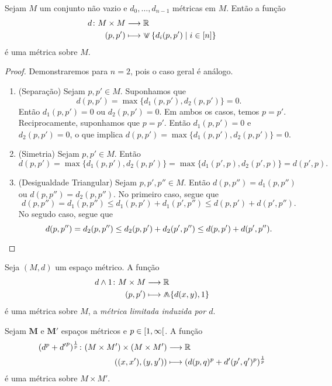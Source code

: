 \begin{proposition}
Sejam $M$ um conjunto não vazio e $d_0, \ldots,d_{n-1}$ métricas em $M$. Então a função
	\begin{align*}
	\func{d}{M \times M}{\R}{(p,p')}{\max\set{d_i(p,p')}{i \in [n]}}
	\end{align*}
é uma métrica sobre $M$.
\end{proposition}
\begin{proof}
Demonstraremos para $n=2$, pois o caso geral é análogo.
	\begin{enumerate}
	\item (Separação) Sejam $p,p' \in M$. Suponhamos que
	\begin{equation*}
	d(p,p')=\max\{d_1(p,p'),d_2(p,p')\}=0.
	\end{equation*}
Então $d_1(p,p')=0$ ou $d_2(p,p')=0$. Em ambos os casos, temos $p=p'$. Reciprocamente, suponhamos que $p=p'$. Então $d_1(p,p')=0$ e $d_2(p,p')=0$, o que implica $d(p,p')=\max\{d_1(p,p'),d_2(p,p')\}=0$.
	
	\item (Simetria) Sejam $p,p' \in M$. Então
	\begin{equation*}
	d(p,p') = \max\{d_1(p,p'),d_2(p,p')\} = \max\{d_1(p',p),d_2(p',p)\} = d(p',p).
	\end{equation*}
	
	\item (Desigualdade Triangular) Sejam $p,p',p'' \in M$. Então $d(p,p'')=d_1(p,p'')$ ou $d(p,p'')=d_2(p,p'')$. No primeiro caso, segue que
	\begin{equation*}
	d(p,p'') = d_1(p,p'') \leq d_1(p,p') + d_1(p',p'') \leq d(p,p') + d(p',p'').
	\end{equation*}
	No segudo caso, segue que
	\begin{equation*}
	d(p,p'') = d_2(p,p'') \leq d_2(p,p') + d_2(p',p'') \leq d(p,p') + d(p',p''). \qedhere
	\end{equation*}
	\end{enumerate}
\end{proof}

\begin{exercise}
Seja $(M,d)$ um espaço métrico. A função
	\begin{align*}
	\func{d \wedge 1}{M \times M}{\R}{(p,p')}{\min \{d(x,y),1\}}
	\end{align*}
é uma métrica sobre $M$, a \emph{métrica limitada induzida por $d$}.
\end{exercise}

\begin{exercise}[Métricas $p$]
Sejam $\bm M$ e $\bm M'$ espaços métricos e $p \in \left[{1},{\infty}\right[$.
A função
	\begin{align*}
	{(d^p + {d'}^p)^{\frac{1}{p}}}\colon {(M \times M') \times (M \times M')} &\longrightarrow {\mathbb{R}} \\{((x,x'),(y,y'))} &\longmapsto (d(p,q)^p + d'(p',q')^p)^{\frac{1}{p}}
	\end{align*}
é uma métrica sobre $M \times M'$.
\end{exercise}

